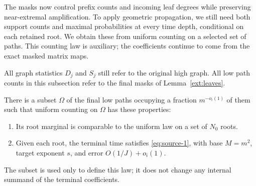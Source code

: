 The masks now control prefix counts and incoming leaf degrees while
preserving near-extremal amplification. To apply geometric propagation,
we still need both support counts and maximal probabilities at every
time depth, conditional on each retained root. We obtain these from
uniform counting on a selected set of paths. This counting law is
auxiliary; the coefficients continue to come from the exact masked
matrix maps.

All graph statistics \(D_j\) and \(S_j\) still refer to the
original high graph. All low path counts in this subsection
refer to the final masks of Lemma~\ref{ext:leaves}.

\begin{lemma}\label{ext:time-law}
There is a subset \(\Omega\) of the final low paths occupying
a fraction \(m^{-o_i(1)}\) of them such that uniform counting
on \(\Omega\) has these properties:
\begin{enumerate}[label=\textup{(\roman*)}]
\item Its root marginal is comparable to the uniform law on
a set of \(N_0\) roots.
\item Given each root, the terminal time satisfies
\eqref{eq:source-1}, with base \(M=m^2\), target exponent \(s\),
and error \(O(1/J)+o_i(1)\).
\end{enumerate}
The subset is used only to define this law; it does not change
any internal summand of the terminal coefficients.
\end{lemma}

